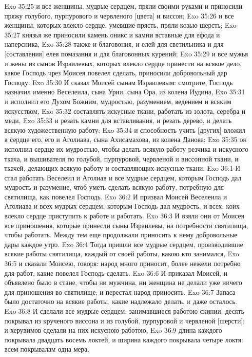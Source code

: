 Exo 35:25  и все женщины, мудрые сердцем, пряли своими руками и приносили пряжу голубого, пурпурового и червленого [цвета] и виссон;
Exo 35:26  и все женщины, которых влекло сердце, умевшие прясть, пряли козью шерсть;
Exo 35:27  князья же приносили камень оникс и камни вставные для ефода и наперсника,
Exo 35:28  также и благовония, и елей для светильника и для [составления] елея помазания и для благовонных курений;
Exo 35:29  и все мужья и жены из сынов Израилевых, которых влекло сердце принести на всякое дело, какое Господь чрез Моисея повелел сделать, приносили добровольный дар Господу.
Exo 35:30  И сказал Моисей сынам Израилевым: смотрите, Господь назначил именно Веселеила, сына Урии, сына Ора, из колена Иудина,
Exo 35:31  и исполнил его Духом Божиим, мудростью, разумением, ведением и всяким искусством,
Exo 35:32  составлять искусные ткани, работать из золота, серебра и меди,
Exo 35:33  и резать камни для вставливания, и резать дерево, и делать всякую художественную работу;
Exo 35:34  и способность учить [других] вложил в сердце его, его и Аголиава, сына Ахисамахова, из колена Данова;
Exo 35:35  он исполнил сердце их мудростью, чтобы делать всякую работу резчика и искусного ткача, и вышивателя по голубой, пурпуровой, червленой и виссонной ткани, и ткачей, делающих всякую работу и составляющих искусные ткани.
Exo 36:1  И стал работать Веселеил и Аголиав и все мудрые сердцем, которым Господь дал мудрость и разумение, чтоб уметь сделать всякую работу, потребную для святилища, как повелел Господь.
Exo 36:2  И призвал Моисей Веселеила и Аголиава и всех мудрых сердцем, которым Господь дал мудрость, и всех, коих влекло сердце приступить к работе и работать.
Exo 36:3  И взяли они от Моисея все приношения, которые принесли сыны Израилевы, на потребности святилища, чтобы работать. Между тем еще продолжали приносить к нему добровольные дары каждое утро.
Exo 36:4  Тогда пришли все мудрые сердцем, производившие всякие работы святилища, каждый от своей работы, какою кто занимался,
Exo 36:5  и сказали Моисею, говоря: народ много приносит, более нежели потребно для работ, какие повелел Господь сделать.
Exo 36:6  И приказал Моисей, и объявлено было в стане, чтобы ни мужчина, ни женщина не делали уже ничего для приношения во святилище; и перестал народ приносить.
Exo 36:7  Запаса было достаточно на всякие работы, какие надлежало делать, и даже осталось.
Exo 36:8  И сделали все мудрые сердцем, занимавшиеся работою скинии: десять покрывал из крученого виссона и из голубой, пурпуровой и червленой [шерсти]; и херувимов сделали на них искусною работою;
Exo 36:9  длина каждого покрывала двадцать восемь локтей, и ширина каждого покрывала четыре локтя: всем покрывалам одна мера.
